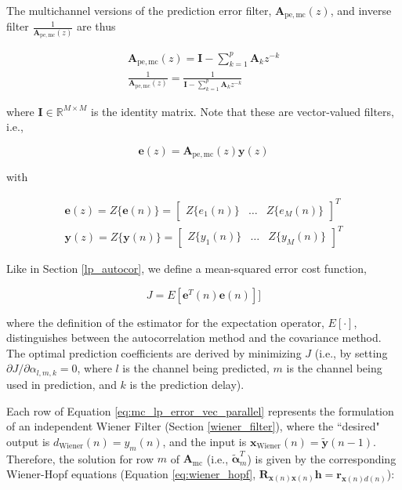 The multichannel versions of the prediction error filter, $\boldsymbol{A}_{\mathrm{pe,mc}}(z)$, and inverse filter $\frac{1}{\boldsymbol{A}_{\mathrm{pe,mc}}(z)}$ are thus

\begin{eqnarray}
	\boldsymbol{A}_{\mathrm{pe,mc}}(z) = \boldsymbol{I} - \sum_{k=1}^{p} \boldsymbol{A}_k z^{-k} \label{eq:mc_pe_filter} \\
	\frac{1}{\boldsymbol{A}_{\mathrm{pe,mc}}(z)} = \frac{1}{\boldsymbol{I} - \sum_{k=1}^{p} \boldsymbol{A}_k z^{-k}}
\end{eqnarray}

\noindent
where $\boldsymbol{I} \in \mathbb{R}^{M \times M}$ is the identity matrix. Note that these are vector-valued filters, i.e., 

\begin{equation}
	\boldsymbol{e}(z) = \boldsymbol{A}_{\mathrm{pe,mc}}(z) \boldsymbol{y}(z)
\end{equation}

\noindent
with 

\noindent
\begin{eqnarray}
	\boldsymbol{e}(z) = Z\{\boldsymbol{e}(n)\} = \begin{bmatrix} Z\{e_1(n)\} & \dots & Z\{e_M(n)\} \end{bmatrix}^T\\
	\boldsymbol{y}(z) = Z\{\boldsymbol{y}(n)\} = \begin{bmatrix} Z\{y_1(n)\} & \dots & Z\{y_M(n)\} \end{bmatrix}^T
\end{eqnarray}

Like in Section \ref{lp_autocor}, we define a mean-squared error cost function, 

\begin{equation}
	J = E[\boldsymbol{e}^T(n)\boldsymbol{e}(n)]]
\end{equation}

\noindent
where the definition of the estimator for the expectation operator, $E[\cdot]$, distinguishes between the autocorrelation method and the covariance method. The optimal prediction coefficients are derived by minimizing $J$ (i.e., by setting $\partial J/\partial \alpha_{l,m,k}=0$, where $l$ is the channel being predicted, $m$ is the channel being used in prediction, and $k$ is the prediction delay). 

Each row of Equation \ref{eq:mc_lp_error_vec_parallel} represents the formulation of an independent Wiener Filter (Section \ref{wiener_filter}), where the ``desired" output is $d_{\mathrm{Wiener}}(n) = y_m(n)$, and the input is $\boldsymbol{x}_{\mathrm{Wiener}}(n) = \boldsymbol{\tilde{y}}(n-1)$. Therefore, the solution for row $m$ of $\boldsymbol{A}_{\mathrm{mc}}$ (i.e., $\boldsymbol{\tilde{\alpha}}^T_m$) is given by the corresponding Wiener-Hopf equations (Equation \ref{eq:wiener_hopf}, $\boldsymbol{R}_{\boldsymbol{x}(n)\boldsymbol{x}(n)}\boldsymbol{h} = \boldsymbol{r}_{\boldsymbol{x}(n)d(n)}$):

